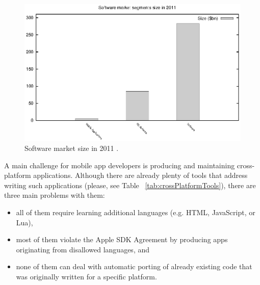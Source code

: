 \documentclass[parskip]{cs4rep}
\begin{document}
\begin{figure}[h!]
    \centering
        \includegraphics[width=1.0\textwidth]{markets}
    \caption{Software market size in 2011 \cite{P1} \cite{P2} \cite{P3}.}
    \label{fig:softwareMarket2011}
\end{figure}

A main challenge for mobile app developers is producing and maintaining cross-platform applications. Although there are already plenty of tools that address writing such applications (please, see Table ~\ref{tab:crossPlatformTools}), there are three main problems with them:

\begin{itemize}
\item
all of them require learning additional languages (e.g. HTML, JavaScript, or
Lua),
\item
most of them violate the Apple SDK Agreement \cite{P5} \cite{P6} by
producing apps originating from disallowed languages, and
\item
none of them can deal with automatic porting of already existing code that was
originally written for a specific platform.
\end{itemize}
\end{document}
